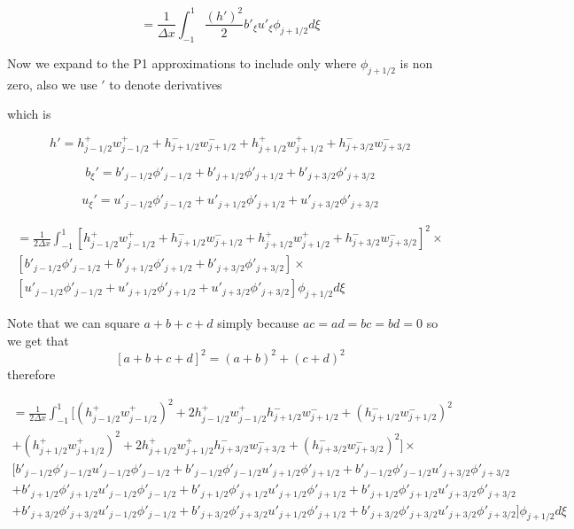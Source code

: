 \documentclass[12pt]{article}
\begin{document}
\[= \frac{1}{\Delta x}\int_{-1}^{1} \frac{(h')^2}{2}b'_{\xi} u'_{\xi} \phi_{j+1/2} d\xi\]

Now we expand to the P1 approximations to include only where $\phi_{j+1/2}$ is non zero, also we use $'$ to denote derivatives

which is

\[h' = h^+_{j-1/2} w^+_{j-1/2} + h^-_{j+1/2} w^-_{j+1/2} + h^+_{j+1/2} w^+_{j+1/2} + h^-_{j+3/2} w^-_{j+3/2}   \]

\[b_{\xi}' = b'_{j-1/2} \phi'_{j-1/2} +  b'_{j+1/2} \phi'_{j+1/2} +  b'_{j+3/2} \phi'_{j+3/2}   \]

\[u_{\xi}' = u'_{j-1/2} \phi'_{j-1/2} +  u'_{j+1/2} \phi'_{j+1/2} + u'_{j+3/2} \phi'_{j+3/2}   \]

\begin{multline}
= \frac{1}{2\Delta x}\int_{-1}^{1} \left[h^+_{j-1/2} w^+_{j-1/2} + h^-_{j+1/2} w^-_{j+1/2} + h^+_{j+1/2} w^+_{j+1/2} + h^-_{j+3/2} w^-_{j+3/2}\right]^2 \times \\
\left[b'_{j-1/2} \phi'_{j-1/2} +  b'_{j+1/2} \phi'_{j+1/2} +  b'_{j+3/2} \phi'_{j+3/2} \right] \times \\
\left[u'_{j-1/2} \phi'_{j-1/2} +  u'_{j+1/2} \phi'_{j+1/2} + u'_{j+3/2} \phi'_{j+3/2} \right] \phi_{j+1/2} d\xi
\end{multline}

Note that we can square $a + b + c +d$ simply because $ac = ad = bc = bd = 0$ so we get that
\[[a +b + c + d]^2 = (a+b)^2 + (c+d)^2\] therefore

\begin{multline}
= \frac{1}{2\Delta x}\int_{-1}^{1} \bigg[\left(h^+_{j-1/2} w^+_{j-1/2}\right)^2 + 2h^+_{j-1/2} w^+_{j-1/2}h^-_{j+1/2} w^-_{j+1/2} + \left(h^-_{j+1/2} w^-_{j+1/2}\right)^2  \\+ \left(h^+_{j+1/2} w^+_{j+1/2}\right)^2 + 2h^+_{j+1/2} w^+_{j+1/2}h^-_{j+3/2} w^-_{j+3/2} + \left(h^-_{j+3/2} w^-_{j+3/2}\right)^2\bigg] \times \\
\bigg[b'_{j-1/2} \phi'_{j-1/2}u'_{j-1/2} \phi'_{j-1/2} + b'_{j-1/2} \phi'_{j-1/2}u'_{j+1/2} \phi'_{j+1/2}  +  b'_{j-1/2} \phi'_{j-1/2} u'_{j+3/2} \phi'_{j+3/2} \\+ b'_{j+1/2} \phi'_{j+1/2}u'_{j-1/2} \phi'_{j-1/2} + b'_{j+1/2} \phi'_{j+1/2}u'_{j+1/2} \phi'_{j+1/2} +  b'_{j+1/2} \phi'_{j+1/2}u'_{j+3/2} \phi'_{j+3/2} \\+  b'_{j+3/2} \phi'_{j+3/2} u'_{j-1/2} \phi'_{j-1/2} +   b'_{j+3/2} \phi'_{j+3/2} u'_{j+1/2} \phi'_{j+1/2} +  b'_{j+3/2} \phi'_{j+3/2} u'_{j+3/2} \phi'_{j+3/2}   \bigg] \phi_{j+1/2} d\xi
\end{multline}
\end{document}
